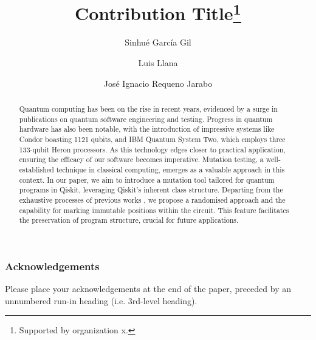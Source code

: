 \documentclass[runningheads]{llncs}
\begin{document}
%
\title{Contribution Title\thanks{Supported by organization x.}}
%
%
\author{Sinhué García Gil \and
Luis Llana\and
José Ignacio Requeno Jarabo}
%
%
%
\maketitle           %
%
\begin{abstract}
Quantum computing has been on the rise in recent years, evidenced by a surge in publications on quantum software engineering and testing. Progress in quantum hardware has also been notable, with the introduction of impressive systems like Condor boasting 1121 qubits, and IBM Quantum System Two, which employs three 133-qubit Heron processors. As this technology edges closer to practical application, ensuring the efficacy of our software becomes imperative. Mutation testing, a well-established technique in classical computing, emerges as a valuable approach in this context. In our paper, we aim to introduce a mutation tool tailored for quantum programs in Qiskit, leveraging Qiskit's inherent class structure. Departing from the exhaustive processes of previous works \cite{mendiluze2021muskit} \cite{fortunato2022qmutpy}, we propose a randomised approach and the capability for marking immutable positions within the circuit. This feature facilitates the preservation of program structure, crucial for future applications.

\end{abstract}
%
%
%






\subsubsection{Acknowledgements} Please place your acknowledgements at
the end of the paper, preceded by an unnumbered run-in heading (i.e.
3rd-level heading).

%
%
%


\end{document}
